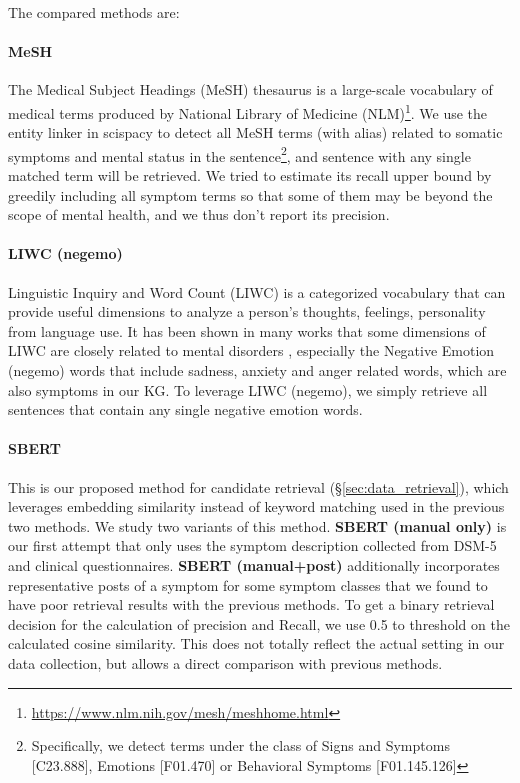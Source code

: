 The compared methods are: 

\paragraph{MeSH} The Medical Subject Headings (MeSH) thesaurus is a large-scale vocabulary of medical terms produced by National Library of Medicine (NLM)\footnote{\url{https://www.nlm.nih.gov/mesh/meshhome.html}}. We use the entity linker in scispacy \citep{neumann2019scispacy} to detect all MeSH terms (with alias) related to somatic symptoms and mental status in the sentence\footnote{Specifically, we detect terms under the class of Signs and Symptoms [C23.888], Emotions [F01.470] or Behavioral Symptoms [F01.145.126]}, and sentence with any single matched term will be retrieved. We tried to estimate its recall upper bound by greedily including all symptom terms so that some of them may be beyond the scope of mental health, and we thus don't report its precision. 
\paragraph{LIWC (negemo)} Linguistic Inquiry and Word Count (LIWC) \citep{pennebaker2001linguistic} is a categorized vocabulary that can provide useful dimensions to analyze a person's thoughts, feelings, personality from language use. It has been shown in many works that some dimensions of LIWC are closely related to mental disorders \citet{shen2017depression,cohan2018smhd}, especially the Negative Emotion (negemo) words that include sadness, anxiety and anger related words, which are also symptoms in our KG. To leverage LIWC (negemo), we simply retrieve all sentences that contain any single negative emotion words. 

\paragraph{SBERT} This is our proposed method for candidate retrieval (\S \ref{sec:data_retrieval}), which leverages embedding similarity instead of keyword matching used in the previous two methods. We study two variants of this method. \textbf{SBERT (manual only)} is our first attempt that only uses the symptom description collected from DSM-5 and clinical questionnaires. \textbf{SBERT (manual+post)} additionally incorporates representative posts of a symptom for some symptom classes that we found to have poor retrieval results with the previous methods. To get a binary retrieval decision for the calculation of precision and Recall, we use 0.5 to threshold on the calculated cosine similarity. This does not totally reflect the actual setting in our data collection, but allows a direct comparison with previous methods.

